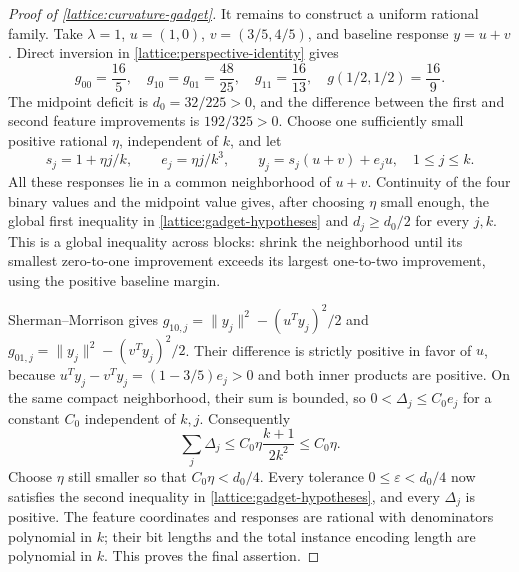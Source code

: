 \begin{proof}[Proof of \cref{lattice:curvature-gadget}]
It remains to construct a uniform rational family. Take $\lambda=1$,
$u=(1,0)$, $v=(3/5,4/5)$, and baseline response $y=u+v$. Direct inversion
in \eqref{lattice:perspective-identity} gives
\begin{equation*}
 g_{00}=\frac{16}{5},\quad
 g_{10}=g_{01}=\frac{48}{25},\quad
 g_{11}=\frac{16}{13},\quad
 g(1/2,1/2)=\frac{16}{9}.
\end{equation*}
The midpoint deficit is $d_0=32/225>0$, and the difference between the
first and second feature improvements is $192/325>0$.
Choose one sufficiently small positive rational $\eta$, independent of
$k$, and let
\begin{equation}
 s_j=1+\eta j/k,\qquad e_j=\eta j/k^3,
 \qquad y_j=s_j(u+v)+e_ju,
 \quad 1\le j\le k.
 \label{lattice:rational-family}
\end{equation}
All these responses lie in a common neighborhood of $u+v$. Continuity
of the four binary values and the midpoint value gives, after choosing
$\eta$ small enough, the global first inequality in
\eqref{lattice:gadget-hypotheses} and $d_j\ge d_0/2$ for every $j,k$.
This is a global inequality across blocks: shrink the neighborhood until
its smallest zero-to-one improvement exceeds its largest one-to-two
improvement, using the positive baseline margin.

Sherman--Morrison gives
$g_{10,j}=\|y_j\|^2-(u^Ty_j)^2/2$ and
$g_{01,j}=\|y_j\|^2-(v^Ty_j)^2/2$. Their difference is strictly positive
in favor of $u$, because
$u^Ty_j-v^Ty_j=(1-3/5)e_j>0$ and both inner products are positive.
On the same compact neighborhood, their sum is bounded, so
$0<\Delta_j\le C_0e_j$ for a constant $C_0$ independent of $k,j$.
Consequently
\begin{equation*}
 \sum_j\Delta_j\le C_0\eta\frac{k+1}{2k^2}\le C_0\eta.
\end{equation*}
Choose $\eta$ still smaller so that $C_0\eta<d_0/4$. Every tolerance
$0\le\varepsilon<d_0/4$ now satisfies the second inequality in
\eqref{lattice:gadget-hypotheses}, and every $\Delta_j$ is positive.
The feature coordinates and responses are rational with denominators
polynomial in $k$; their bit lengths and the total instance encoding
length are polynomial in $k$. This proves the final assertion.
\end{proof}
